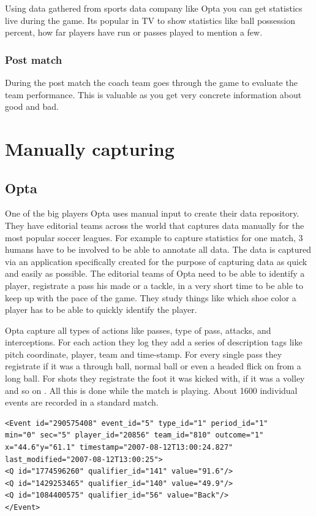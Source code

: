 Using data gathered from sports data company like Opta you can get statistics live during the game. Its popular in TV to show statistics like ball possession percent, how far players have run or passes played to mention a few. 

\subsubsection{Post match}

During the post match the coach team goes through the game to evaluate the team performance. This is valuable as you get very concrete information about good and bad.  

\section{Manually capturing }

\subsection{Opta }


One of the big players Opta uses manual input to create their data repository. They have editorial teams across the world that captures data manually for the most popular soccer leagues. For example to capture statistics for one match, 3 humans have to be involved to be able to annotate all data. The data is captured via an application specifically created for the purpose of capturing data as quick and easily as possible. The editorial teams of Opta need to be able to identify a player, registrate a pass his made or a tackle, in a very short time to be able to keep up with the pace of the game. They study things like which shoe color a player has to be able to quickly identify the player.

Opta capture all types of actions like passes, type of pass, attacks, and interceptions. For each action they log they add a series of description tags like pitch coordinate, player, team and time-stamp. For every single pass they registrate if it was a through ball, normal ball or even a headed flick on from a long ball. For shots they registrate the foot it was kicked with, if it was a volley and so on . All this is done while the match is playing. About 1600 individual events are recorded in a standard match. 

\begin{lstlisting}
<Event id="290575408" event_id="5" type_id="1" period_id="1" 
min="0" sec="5" player_id="20856" team_id="810" outcome="1" 
x="44.6"y="61.1" timestamp="2007-08-12T13:00:24.827" 
last_modified="2007-08-12T13:00:25">
<Q id="1774596260" qualifier_id="141" value="91.6"/>
<Q id="1429253465" qualifier_id="140" value="49.9"/>
<Q id="1084400575" qualifier_id="56" value="Back"/>
</Event>
\end{lstlisting}

